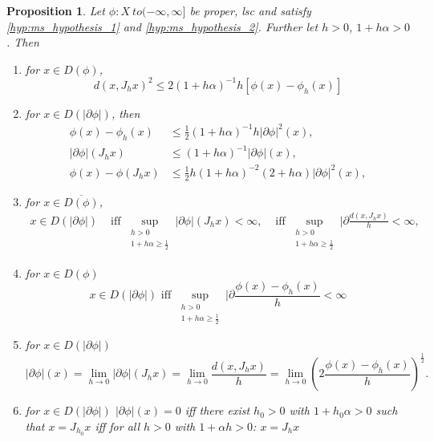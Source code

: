 \documentclass[a4paper,11pt, leqno]{scrreprt} %
\renewcommand{\leq}{\leqslant}
\renewcommand{\leq}{\leqslant}
\renewcommand{\geq}{\geqslant}
\theoremstyle{change}
\newcounter{acounter}[chapter]
\newtheorem{proposition}[acounter]{Proposition}
\theoremstyle{nonumberplain}
\begin{document}
\begin{proposition}
  Let $\phi : X \ to (-\infty, \infty]$ be proper, lsc and satisfy
  \ref{hyp:ms_hypothesis_1} and \ref{hyp:ms_hypothesis_2}. Further let
  $h > 0$, $1 + h \alpha > 0$. Then
  \begin{enumerate}
  \item for $x \in D(\phi)$,
    \begin{equation}
      \label{eq:ms_prop_3_1}
      d(x, J_h x)^2 \leq 2( 1 + h\alpha)^{-1} h[\phi(x) - \phi_h(x)]
    \end{equation}
  \item for $x \in D(|\partial \phi|)$,
    then
    \begin{align}
      \label{eq:ms_prop_3_2}
      \phi(x) - \phi_h(x) &\leq \frac12 (1 + h \alpha)^{-1} h |\partial \phi|^2(x),\\
      \label{eq:ms_prop_3_3}
      |\partial \phi|(J_h x) &\leq (1 + h \alpha)^{-1} |\partial
      \phi|(x),\\
      \label{eq:ms_prop_3_4}
      \phi(x) - \phi(J_h x) & \leq \frac12 h (1 + h \alpha)^{-2} (2 +
      h \alpha)|\partial \phi|^2(x),
    \end{align}
  \item for $x \in \overline{D(\phi)}$, 
    \begin{align}
      x \in D(|\partial \phi|) & \text{ iff } \sup_{\substack{h > 0\\
          1 + h \alpha \geq \frac12}} |\partial \phi|(J_h x) < \infty,
      \label{eq:ms_prop_3_6}
      &\text{ iff } \sup_{\substack{h > 0\\
          1 + h \alpha \geq \frac12}} |\partial \frac{d(x, J_h x)}{h} < \infty,
    \end{align}
  \item for $x \in D(\phi)$
    \begin{equation}
      \label{eq:ms_prop_3_7}
      x \in D(|\partial \phi|) \text{ iff } \sup_{\substack{h > 0\\
          1 + h \alpha \geq \frac12}} |\partial \frac{\phi(x) - \phi_h(x)}{h} < \infty
    \end{equation}
  \item for $x \in D(|\partial \phi|)$
    \begin{equation}
      \label{eq:ms_prop_3_8}
      |\partial \phi|(x) = \lim_{h \to 0} |\partial \phi|(J_h x) =
      \lim_{h \to 0} \frac{d(x, J_h x)}{h} = \lim_{h \to 0} \left ( 2
        \frac{\phi(x) - \phi_h(x)}{h} \right )^{\frac12}.
    \end{equation}
  \item for $x \in D(|\partial \phi|)$
      $|\partial \phi|(x) = 0$ iff there exist $h_0 > 0$ with $1
        + h_0 \alpha > 0$ such that $x = J_{h_0} x$ iff for all $h >
        0$ with $1 + \alpha h > 0$: $x = J_h x$
  \end{enumerate}
\end{proposition}
\end{document}
